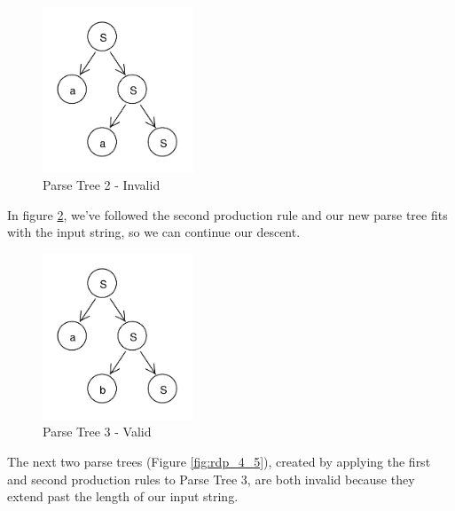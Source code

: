 \documentclass[11pt]{article}
\begin{document}
\begin{figure}[h!]
    \centering
    \includegraphics[width=0.4\textwidth,natwidth=30,natheight=30]{rdp_2.pdf}
    \caption{Parse Tree 2 - Invalid}
    \label{fig:rdp_2}
\end{figure}

In figure \ref{fig:rdp_3}, we've followed the second production rule
and our new parse tree fits with the input string, so we can continue our descent.

\begin{figure}[h!]
    \centering
    \includegraphics[width=0.4\textwidth,natwidth=30,natheight=30]{rdp_3.pdf}
    \caption{Parse Tree 3 - Valid}
    \label{fig:rdp_3}
\end{figure}

The next two parse trees (Figure \ref{fig:rdp_4_5}), created by applying the first and second production rules to
Parse Tree 3, are both invalid because they extend past the length of our input string.
\end{document}
